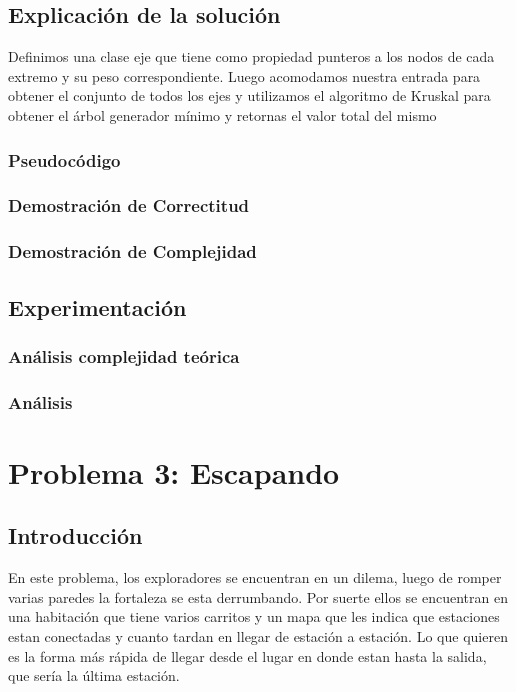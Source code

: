 \documentclass[spanish,12pt]{article}
\begin{document}
\subsection{Explicación de la solución}

Definimos una clase eje que tiene como propiedad punteros a los nodos de cada extremo y su peso correspondiente.
Luego acomodamos nuestra entrada para obtener el conjunto de todos los ejes y utilizamos el algoritmo de Kruskal para obtener el árbol generador mínimo y retornas el valor total del mismo



\subsubsection{Pseudocódigo}


\subsubsection{Demostración de Correctitud}


\subsubsection{Demostración de Complejidad}


\subsection{Experimentación}


\subsubsection{Análisis complejidad te\'orica}


\subsubsection{Análisis}



\section{Problema 3: Escapando}

\subsection{Introducción}

En este problema, los exploradores se encuentran en un dilema, luego de romper varias paredes la fortaleza se esta derrumbando. Por suerte ellos se encuentran en una habitación que tiene varios carritos y un mapa que les indica que estaciones estan conectadas y cuanto tardan en llegar de estación a estación. Lo que quieren es la forma más rápida de llegar desde el lugar en donde estan hasta la salida, que sería la última estación.
\end{document}
